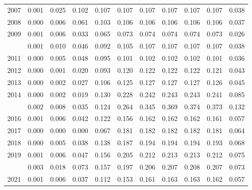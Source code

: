 \documentclass[
]{article}
\begin{document}
\begin{longtable}[t]{lrrrrrrrrrr}
2007 & 0.001 & 0.025 & 0.102 & 0.107 & 0.107 & 0.107 & 0.107 & 0.107 & 0.107 & 0.038\\
2008 & 0.000 & 0.006 & 0.061 & 0.103 & 0.106 & 0.106 & 0.106 & 0.106 & 0.106 & 0.037\\
2009 & 0.001 & 0.006 & 0.033 & 0.065 & 0.073 & 0.074 & 0.074 & 0.074 & 0.073 & 0.026\\
\addlinespace
2010 & 0.001 & 0.010 & 0.046 & 0.092 & 0.105 & 0.107 & 0.107 & 0.107 & 0.107 & 0.038\\
2011 & 0.000 & 0.005 & 0.048 & 0.095 & 0.101 & 0.102 & 0.102 & 0.102 & 0.101 & 0.036\\
2012 & 0.000 & 0.001 & 0.020 & 0.093 & 0.120 & 0.122 & 0.122 & 0.122 & 0.121 & 0.043\\
2013 & 0.000 & 0.002 & 0.027 & 0.106 & 0.125 & 0.127 & 0.127 & 0.127 & 0.126 & 0.045\\
2014 & 0.000 & 0.002 & 0.019 & 0.130 & 0.228 & 0.242 & 0.243 & 0.243 & 0.241 & 0.085\\
\addlinespace
2015 & 0.002 & 0.008 & 0.035 & 0.124 & 0.264 & 0.345 & 0.369 & 0.374 & 0.373 & 0.132\\
2016 & 0.001 & 0.006 & 0.042 & 0.122 & 0.156 & 0.162 & 0.162 & 0.162 & 0.161 & 0.057\\
2017 & 0.000 & 0.000 & 0.000 & 0.067 & 0.181 & 0.182 & 0.182 & 0.182 & 0.181 & 0.064\\
2018 & 0.000 & 0.005 & 0.038 & 0.138 & 0.187 & 0.194 & 0.194 & 0.194 & 0.193 & 0.068\\
2019 & 0.001 & 0.006 & 0.047 & 0.156 & 0.205 & 0.212 & 0.213 & 0.213 & 0.212 & 0.075\\
\addlinespace
2020 & 0.003 & 0.018 & 0.073 & 0.157 & 0.197 & 0.206 & 0.207 & 0.208 & 0.207 & 0.073\\
2021 & 0.001 & 0.006 & 0.037 & 0.112 & 0.153 & 0.161 & 0.163 & 0.163 & 0.162 & 0.057\\*
\end{longtable}
\end{document}
